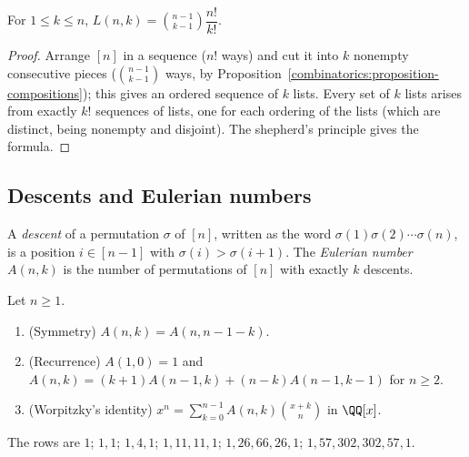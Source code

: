 \begin{proposition}\label{combinatorics:proposition-lah}
For $1 \leq k \leq n$, $L(n, k) = \binom{n - 1}{k - 1}\dfrac{n!}{k!}$.
\end{proposition}

\begin{proof}
Arrange $[n]$ in a sequence ($n!$ ways) and cut it into $k$ nonempty consecutive pieces ($\binom{n-1}{k-1}$ ways, by Proposition~\ref{combinatorics:proposition-compositions}); this gives an ordered
sequence of $k$ lists. Every set of $k$ lists arises from exactly $k!$ sequences of lists, one for each ordering of the lists (which are distinct, being nonempty and disjoint). The shepherd's principle
gives the formula.
\end{proof}

\subsection{Descents and Eulerian numbers}\label{combinatorics:subsection-eulerian}

\begin{definition}\label{combinatorics:definition-eulerian}
A \emph{descent} of a permutation $\sigma$ of $[n]$, written as the word $\sigma(1)\sigma(2) \cdots \sigma(n)$, is a position $i \in [n - 1]$ with $\sigma(i) > \sigma(i + 1)$. The \emph{Eulerian
number} $A(n, k)$ is the number of permutations of $[n]$ with exactly $k$ descents.
\end{definition}

\begin{proposition}\label{combinatorics:proposition-eulerian}
Let $n \geq 1$.
\begin{enumerate}
\item (Symmetry) $A(n, k) = A(n, n - 1 - k)$.
\item (Recurrence) $A(1, 0) = 1$ and $A(n, k) = (k + 1)A(n - 1, k) + (n - k)A(n - 1, k - 1)$ for $n \geq 2$.
\item (Worpitzky's identity) $x^n = \sum_{k=0}^{n-1}A(n, k)\binom{x + k}{n}$ in $\QQ[x]$.
\end{enumerate}
The rows are $1$; $1, 1$; $1, 4, 1$; $1, 11, 11, 1$; $1, 26, 66, 26, 1$; $1, 57, 302, 302, 57, 1$.
\end{proposition}

